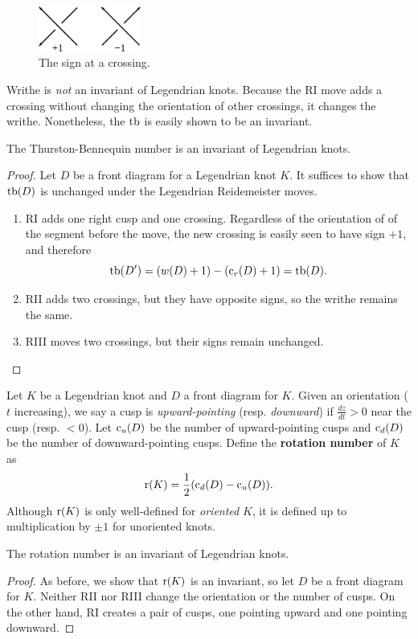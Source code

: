 \begin{figure}[ht]
    \centering
    \includegraphics[width=0.3\textwidth]{images/writhe.pdf}
    \caption{The sign at a crossing.}%
    \label{fig:writhe}
\end{figure}

Writhe is \emph{not} an invariant of Legendrian knots. Because the RI move adds a crossing without changing the orientation of other crossings, it changes the writhe. Nonetheless, the $\operatorname{tb}$ is easily shown to be an invariant.

\begin{proposition}
    The Thurston-Bennequin number is an invariant of Legendrian knots.
\end{proposition}
\begin{proof}
    Let $D$ be a front diagram for a Legendrian knot $K$. It suffices to show that $\operatorname{tb}(D)$ is unchanged under the Legendrian Reidemeister moves.

    \begin{enumerate}
        \item RI adds one right cusp and one crossing. Regardless of the orientation of of the segment before the move, the new crossing is easily seen to have sign $+1$, and therefore
            \[
                \operatorname{tb}(D') = (w(D) + 1) - (\operatorname{c}_r(D) + 1) = \operatorname{tb}(D).
            \]
        \item RII adds two crossings, but they have opposite signs, so the writhe remains the same.
        \item RIII moves two crossings, but their signs remain unchanged.
    \end{enumerate}
    
\end{proof}

\begin{definition}
    Let $K$ be a Legendrian knot and $D$ a front diagram for $K$.
    Given an orientation ($t$ increasing), we say a cusp is \emph{upward-pointing} (resp. \emph{downward}) if $\frac{dz}{dt} > 0$ near the cusp (resp. $< 0$).
    Let $\operatorname{c}_u(D)$ be the number of upward-pointing cusps and $\operatorname{c}_d(D)$ be the number of downward-pointing cusps. Define the \textbf{rotation number} of $K$ as 
    \[
        \operatorname{r}(K) = \frac{1}{2} (\operatorname{c}_d(D) - \operatorname{c}_u(D)).
    \]
    Although $\operatorname{r}(K)$ is only well-defined for \emph{oriented} $K$, it is defined up to multiplication by $\pm 1$ for unoriented knots.
\end{definition}
\begin{proposition}
    The rotation number is an invariant of Legendrian knots.
\end{proposition}
\begin{proof}
    As before, we show that $\operatorname{r}(K)$ is an invariant, so let $D$ be a front diagram for $K$. Neither RII nor RIII change the orientation or the number of cusps. On the other hand, RI creates a pair of cusps, one pointing upward and one pointing downward.
\end{proof}

